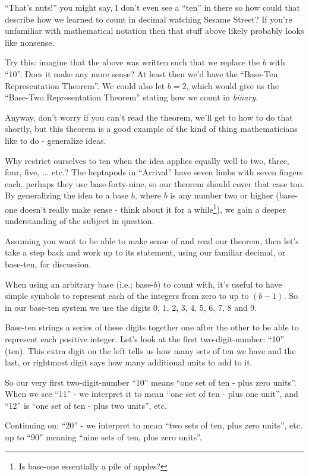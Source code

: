 \documentclass{article}
\begin{document}
``That's nuts!'' you might say, I don't even see a ``ten'' in there so how could that
describe how we learned to count in decimal watching Sesame Street? 
If you're unfamiliar with mathematical notation then that stuff above likely probably looks
like nonsense.

Try this: imagine that the above was 
written such that
we replace the $b$ with ``10''. Does it make any more sense?
At least then we'd have the ``Base-Ten Representation Theorem''. We could also let $b=2$,
which would give us the 
``Base-Two Representation Theorem'' stating how we count in \emph{binary}.

Anyway, don't worry if you can't read the theorem, we'll get to how to do that shortly, but
this theorem is a good example of the kind of thing mathematicians like to do - generalize ideas.

Why restrict ourselves to ten when the idea applies equally well to two, three, four, five, ... etc.?
The heptapods in ``Arrival'' have  seven limbs with seven fingers each, perhaps they
use base-forty-nine, so our
theorem should cover that case too.  By generalizing the idea to a base $b$,
where $b$ is any number two or higher (base-one doesn't really make sense
- think about it for a while\footnote{Is base-one essentially a pile of apples?}),
we gain a deeper understanding of the subject in question.

Assuming you want to be able to make sense of and read our theorem, then let's take a step
back and work up to its statement,
using our familiar decimal, or base-ten, for discussion.

When using an arbitrary base (i.e.; base-$b$) to count with,
it's useful to have simple symbols to represent each of the integers from zero to up to $(b-1)$.
So in our base-ten system we use the
digits 0, 1, 2, 3, 4, 5, 6, 7, 8 and 9.

Base-ten strings a series of these digits together
one after the other to be able to represent each positive integer.
Let's look at the first two-digit-number: ``10'' (ten).
This extra digit on the left tells us how many sets of ten we have and the last,
or rightmost digit says how many additional units to add to it.

So our very first two-digit-number ``10'' means ``one set of ten - plus zero units''.
When we see ``11'' - we interpret it to mean ``one set of ten - plus one unit'',
and ``12'' is ``one set of ten - plus two units'', etc.

Continuing on; ``20'' - we interpret to mean ``two sets of ten,
plus zero units'', etc. up to ``90'' meaning ``nine sets of ten,
plus zero units''.
\end{document}
